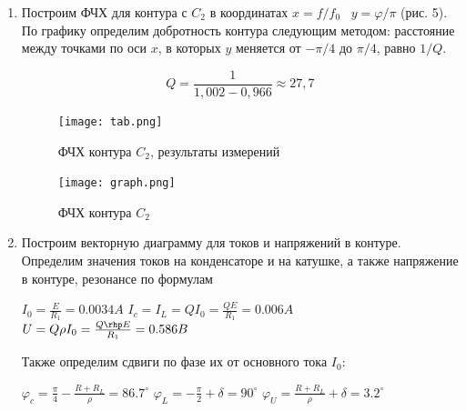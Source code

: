 \documentclass[a4paper]{article}
\begin{document}
\begin{enumerate}
    \item Построим ФЧХ для контура с $C_2$ в координатах $x = f/f_0 \;\;\; y = \varphi/\pi   $ (рис. 5). По графику определим добротность контура следующим методом: расстояние между точками по оси $x$, в которых $y$ меняется от $-\pi/4$ до $\pi/4$, равно $1/Q$. 
    
    $$Q = \frac{1}{1,002-0,966} \approx 27,7$$
    
    
    \begin{figure}[h]
    \centering
    \texttt{[image: tab.png]}
    \caption{ФЧХ контура $C_2$, результаты измерений}
    \label{fig:vac}
\end{figure}
    
    \begin{figure}[h]
    \centering
    \texttt{[image: graph.png]}
    \caption{ФЧХ контура $C_2$}
    \label{fig:vac}
\end{figure}

\newpage

\item Построим векторную диаграмму для токов и напряжений в контуре. Определим значения токов на конденсаторе и на катушке, а также напряжение в контуре,  резонансе по формулам
\begin{center}
    $I_0 = \frac{E}{R_1} = 0.0034 A$ $I_c = I_L = Q I_0 = \frac{Q E}{R_1} = 0.006 A$ \hspace{1cm} $U = Q\rho I_0 = \frac{Q\rhp E}{R_1} = 0.586 B$
\end{center}
    
    Также определим сдвиги по фазе их от основного тока $I_0$:
    \begin{center}
        $\varphi_c = \frac{\pi}{4} - \frac{R + R_L}{\rho} = 86.7 ^{\circ}$ \hspace{1cm} $\varphi_L = -\frac{\pi}{2} + \delta = 90 ^{\circ}$ \hspace{1cm} $\varphi_U = \frac{R + R_L}{\rho} + \delta = 3.2 ^{\circ} $
    \end{center}
    

\end{enumerate}
\end{document}
